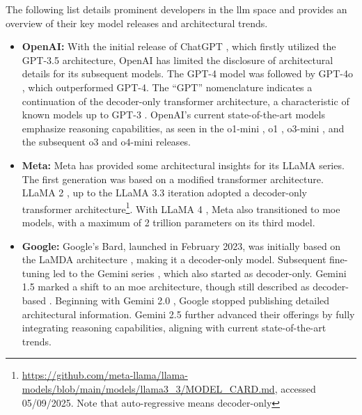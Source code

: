  The following list details prominent developers in the \ac{llm} space and provides an overview of their key model releases and architectural trends.
\begin{itemize}
    \item \textbf{OpenAI:} With the initial release of ChatGPT \cite{openai_introducing_2022}, which firstly utilized the GPT-3.5 architecture, OpenAI has limited the disclosure of architectural details for its subsequent models. The GPT-4 model \cite{openai_gpt-4_2024} was followed by GPT-4o \cite{openai_gpt-4o_2024}, which outperformed GPT-4. The \enquote{GPT} nomenclature indicates a continuation of the decoder-only transformer architecture, a characteristic of known models up to GPT-3 \cite{brown_language_2020}. OpenAI's current state-of-the-art models emphasize reasoning capabilities, as seen in the o1-mini \cite{openai_openai_2024}, o1 \cite{openai_openai_2024-1}, o3-mini \cite{openai_openai_2025}, and the subsequent o3 and o4-mini \cite{openai_openai_2025-1} releases.

    \item \textbf{Meta:} Meta has provided some architectural insights for its LLaMA series. The first generation \cite{touvron_llama_2023} was based on a modified transformer architecture. LLaMA 2 \cite{touvron_llama_2023-1}, up to the LLaMA 3.3 iteration adopted a decoder-only transformer architecture\footnote{\url{https://github.com/meta-llama/llama-models/blob/main/models/llama3_3/MODEL_CARD.md}, accessed 05/09/2025. Note that auto-regressive means decoder-only}. With LLaMA 4 \cite{meta_ai_llama_2025}, Meta also transitioned to \ac{moe} models, with a maximum of 2 trillion parameters on its third model.

    \item \textbf{Google:} Google's Bard, launched in February 2023, was initially based on the LaMDA architecture \cite{pichai_important_2023,thoppilan_lamda_2022}, making it a decoder-only model. Subsequent fine-tuning led to the Gemini series \cite{team_gemini_2024}, which also started as decoder-only. Gemini 1.5 marked a shift to an \ac{moe} architecture, though still described as decoder-based \cite{team_gemini_2024-1}. Beginning with Gemini 2.0 \cite{pichai_introducing_2024}, Google stopped publishing detailed architectural information. Gemini 2.5 \cite{kavukcuoglu_gemini_2025} further advanced their offerings by fully integrating reasoning capabilities, aligning with current state-of-the-art trends.


\end{itemize}
